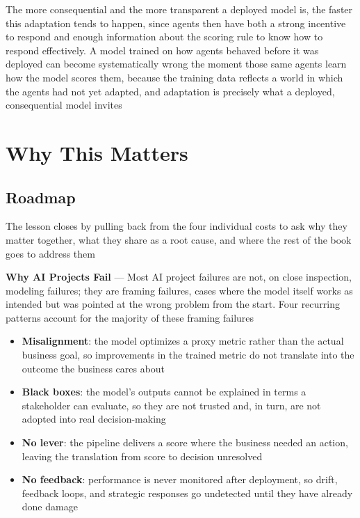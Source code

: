 The more consequential and the more transparent a deployed model is, the faster this
adaptation tends to happen, since agents then have both a strong incentive to
respond and enough information about the scoring rule to know how to respond
effectively. A model trained on how agents behaved before it was deployed can become
systematically wrong the moment those same agents learn how the model scores them,
because the training data reflects a world in which the agents had not yet
adapted, and adaptation is precisely what a deployed, consequential model
invites

\section{Why This Matters}
\label{chap:why-this-matters}

\subsection{Roadmap}
\label{sec:why-this-matters-roadmap}

The lesson closes by pulling back from the four individual costs to ask why they
matter together, what they share as a root cause, and where the rest of the book
goes to address them

\textbf{Why AI Projects Fail} --- Most AI project failures are not, on close
inspection, modeling failures; they are framing failures, cases where the model itself
works as intended but was pointed at the wrong problem from the start. Four
recurring patterns account for the majority of these framing failures

\begin{itemize}
  \item \textbf{Misalignment}: the model optimizes a proxy metric rather than the
    actual business goal, so improvements in the trained metric do not translate
    into the outcome the business cares about

  \item \textbf{Black boxes}: the model's outputs cannot be explained in terms a
    stakeholder can evaluate, so they are not trusted and, in turn, are not
    adopted into real decision-making

  \item \textbf{No lever}: the pipeline delivers a score where the business needed
    an action, leaving the translation from score to decision unresolved

  \item \textbf{No feedback}: performance is never monitored after deployment,
    so drift, feedback loops, and strategic responses go undetected until they
    have already done damage
\end{itemize}

